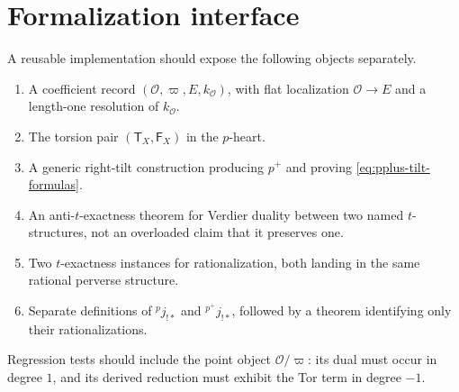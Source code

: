 \section{Formalization interface}

\begin{formalization}
A reusable implementation should expose the following objects separately.
\begin{enumerate}
\item A coefficient record \((\mathcal O,\varpi,E,k_{\mathcal O})\), with
      flat localization \(\mathcal O\to E\) and a length-one resolution of
      \(k_{\mathcal O}\).
\item The torsion pair \((\mathsf T_X,\mathsf F_X)\) in the \(p\)-heart.
\item A generic right-tilt construction producing \(p^+\) and proving
      \eqref{eq:pplus-tilt-formulas}.
\item An anti-\(t\)-exactness theorem for Verdier duality between two named
      \(t\)-structures, not an overloaded claim that it preserves one.
\item Two \(t\)-exactness instances for rationalization, both landing in the
      same rational perverse structure.
\item Separate definitions of \({}^p j_{!*}\) and
      \({}^{p^+}j_{!*}\), followed by a theorem identifying only their
      rationalizations.
\end{enumerate}
Regression tests should include the point object
\(\mathcal O/\varpi\): its dual must occur in degree \(1\), and its derived
reduction must exhibit the Tor term in degree \(-1\).
\end{formalization}

